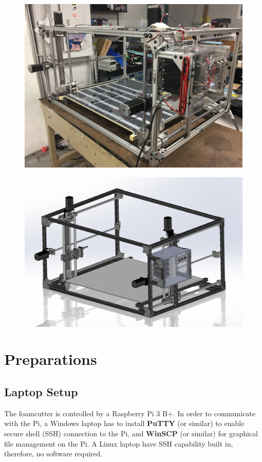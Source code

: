\documentclass[titlepage,12pt,letter]{report}
\numberwithin{equation}{chapter}
\begin{document}
\newpage
\begin{figure} [H]
	\includegraphics[width = 0.9\linewidth]{./Figures/overview.jpg}
\end{figure}
\begin{figure} [H]
	\includegraphics[width = 0.9\linewidth]{./Figures/SW.png}
\end{figure}

\newpage
\tableofcontents
\newpage

\chapter{Preparations}
\section{Laptop Setup} 
\label{sec:laptop}

The foamcutter is controlled by a Raspberry Pi 3 B+. In order to communicate with the Pi, a Windows laptop has to install \textbf{PuTTY} (or similar) to enable secure shell (SSH) connection to the Pi, and \textbf{WinSCP} (or similar) for graphical file management on the Pi. A Linux laptop have SSH capability built in, therefore, no software required. \\
\end{document}

